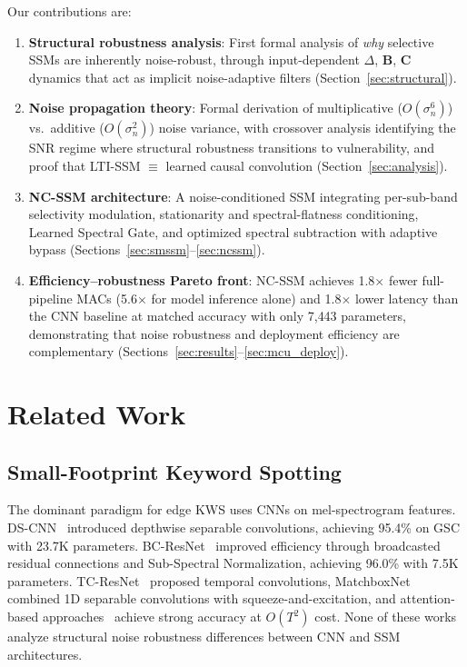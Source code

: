 \documentclass[journal]{IEEEtran}
\begin{document}
Our contributions are:
\begin{enumerate}
\setlength\itemsep{0pt}\setlength\parsep{0pt}
\item \textbf{Structural robustness analysis}: First formal analysis of \emph{why} selective SSMs are inherently noise-robust, through input-dependent $\Delta$, $\mathbf{B}$, $\mathbf{C}$ dynamics that act as implicit noise-adaptive filters (Section~\ref{sec:structural}).
\item \textbf{Noise propagation theory}: Formal derivation of multiplicative ($O(\sigma_n^6)$) vs.\ additive ($O(\sigma_n^2)$) noise variance, with crossover analysis identifying the SNR regime where structural robustness transitions to vulnerability, and proof that LTI-SSM $\equiv$ learned causal convolution (Section~\ref{sec:analysis}).
\item \textbf{NC-SSM architecture}: A noise-conditioned SSM integrating per-sub-band selectivity modulation, stationarity and spectral-flatness conditioning, Learned Spectral Gate, and optimized spectral subtraction with adaptive bypass (Sections~\ref{sec:smssm}--\ref{sec:ncssm}).
\item \textbf{Efficiency--robustness Pareto front}: NC-SSM achieves 1.8$\times$ fewer full-pipeline MACs (5.6$\times$ for model inference alone) and 1.8$\times$ lower latency than the CNN baseline at matched accuracy with only 7{,}443 parameters, demonstrating that noise robustness and deployment efficiency are complementary (Sections~\ref{sec:results}--\ref{sec:mcu_deploy}).
\end{enumerate}


\section{Related Work}
\label{sec:related}

\subsection{Small-Footprint Keyword Spotting}

The dominant paradigm for edge KWS uses CNNs on mel-spectrogram features.
DS-CNN~\cite{zhang2017hello} introduced depthwise separable convolutions, achieving 95.4\% on GSC with 23.7K parameters.
BC-ResNet~\cite{kim2021bcresnet} improved efficiency through broadcasted residual connections and Sub-Spectral Normalization, achieving 96.0\% with 7.5K parameters.
TC-ResNet~\cite{choi2019temporal} proposed temporal convolutions, MatchboxNet~\cite{majumdar2020matchboxnet} combined 1D separable convolutions with squeeze-and-excitation, and attention-based approaches~\cite{berg2021keyword} achieve strong accuracy at $O(T^2)$ cost.
None of these works analyze structural noise robustness differences between CNN and SSM architectures.
\end{document}

